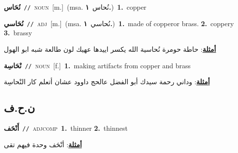 \documentclass[10pt,a4paper,twoside]{article} %
\begin{document}
\begin{multicols}{2}
{\setlength\topsep{0pt}\textbf{\foreignlanguage{arabic}{نُحَاس}}\ {\color{gray}\texttt{//}\color{black}}\ \textsc{noun}\ [m.]\ \color{gray}(msa. \foreignlanguage{arabic}{نُحاس}~\foreignlanguage{arabic}{\textbf{١.}})\color{black}\ \textbf{1.}~copper\ } \vspace{2mm}

{\setlength\topsep{0pt}\textbf{\foreignlanguage{arabic}{نُحَاسي}}\ {\color{gray}\texttt{//}\color{black}}\ \textsc{adj}\ [m.]\ \color{gray}(msa. \foreignlanguage{arabic}{نُحاسي}~\foreignlanguage{arabic}{\textbf{١.}})\color{black}\ \textbf{1.}~made of copperor brass.  \textbf{2.}~coppery  \textbf{3.}~brassy\  \begin{flushright}\color{gray}\foreignlanguage{arabic}{\textbf{\underline{\foreignlanguage{arabic}{أمثلة}}}: حاطة حومرة نُحاسية الله يكسر اييدها عهيك لون طالعة شبه ابو الهول}\end{flushright}\color{black}} \vspace{2mm}

{\setlength\topsep{0pt}\textbf{\foreignlanguage{arabic}{نْحَاسِة}}\ {\color{gray}\texttt{//}\color{black}}\ \textsc{noun}\ [f.]\ \textbf{1.}~making artifacts from copper and brass\  \begin{flushright}\color{gray}\foreignlanguage{arabic}{\textbf{\underline{\foreignlanguage{arabic}{أمثلة}}}: وداني رحمة سيدك أبو الفضل عالحج داوود عشان أتعلم كار النْحاسِة}\end{flushright}\color{black}} \vspace{2mm}

\vspace{-3mm}
\subsection*{\color{blue}\foreignlanguage{arabic}{ن.ح.ف}\color{blue}{}} 

{\setlength\topsep{0pt}\textbf{\foreignlanguage{arabic}{أَنْحَف}}\ {\color{gray}\texttt{//}\color{black}}\ \textsc{adj\textunderscore comp}\ \textbf{1.}~thinner  \textbf{2.}~thinnest\  \begin{flushright}\color{gray}\foreignlanguage{arabic}{\textbf{\underline{\foreignlanguage{arabic}{أمثلة}}}: أنْحَف وحدة فيهم تقى}\end{flushright}\color{black}} \vspace{2mm}


\end{multicols}
\end{document}
